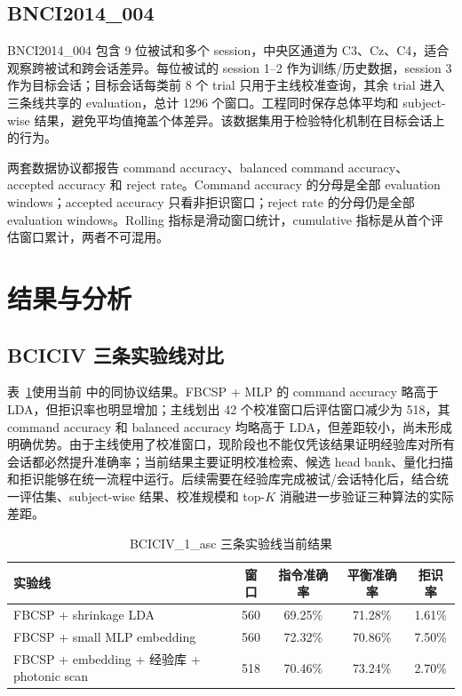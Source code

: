 \documentclass[
    TwoSide=false,
    Degree=graduate,
    GradLevel=master,
    Type=thesis,
    Title={光电混合运动想象脑机接口技术文档}
]{zjuthesis}
\begin{document}
\subsection{BNCI2014\_004}
BNCI2014\_004 包含 9 位被试和多个 session，中央区通道为 C3、Cz、C4，适合观察跨被试和跨会话差异。每位被试的 session 1--2 作为训练/历史数据，session 3 作为目标会话；目标会话每类前 8 个 trial 只用于主线校准查询，其余 trial 进入三条线共享的 evaluation，总计 1296 个窗口。工程同时保存总体平均和 subject-wise 结果，避免平均值掩盖个体差异。该数据集用于检验特化机制在目标会话上的行为。

两套数据协议都报告 command accuracy、balanced command accuracy、accepted accuracy 和 reject rate。Command accuracy 的分母是全部 evaluation windows；accepted accuracy 只看非拒识窗口；reject rate 的分母仍是全部 evaluation windows。Rolling 指标是滑动窗口统计，cumulative 指标是从首个评估窗口累计，两者不可混用。

\section{结果与分析}
\subsection{BCICIV 三条实验线对比}
表~\ref{tab:three-lines}使用当前  中的同协议结果。FBCSP + MLP 的 command accuracy 略高于 LDA，但拒识率也明显增加；主线划出 42 个校准窗口后评估窗口减少为 518，其 command accuracy 和 balanced accuracy 均略高于 LDA，但差距较小，尚未形成明确优势。由于主线使用了校准窗口，现阶段也不能仅凭该结果证明经验库对所有会话都必然提升准确率；当前结果主要证明校准检索、候选 head bank、量化扫描和拒识能够在统一流程中运行。后续需要在经验库完成被试/会话特化后，结合统一评估集、subject-wise 结果、校准规模和 top-$K$ 消融进一步验证三种算法的实际差距。
\begin{table}[H]\centering\small
\caption{BCICIV\_1\_asc 三条实验线当前结果}\label{tab:three-lines}
\begin{tabularx}{0.98\linewidth}{|X|c|c|c|c|}\hline
实验线 & 窗口 & 指令准确率 & 平衡准确率 & 拒识率 \\ \hline
FBCSP + shrinkage LDA & 560 & 69.25\% & 71.28\% & 1.61\% \\ \hline
FBCSP + small MLP embedding & 560 & 72.32\% & 70.86\% & 7.50\% \\ \hline
FBCSP + embedding + 经验库 + photonic scan & 518 & 70.46\% & 73.24\% & 2.70\% \\ \hline
\end{tabularx}
\end{table}
\end{document}

